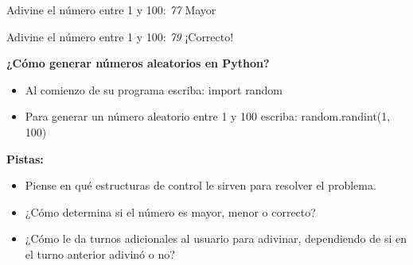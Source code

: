 \documentclass[11pt]{article}
\providecommand{\tightlist}{%
      \setlength{\itemsep}{0pt}\setlength{\parskip}{0pt}}
\begin{document}
Adivine el número entre 1 y 100: \emph{77} Mayor

Adivine el número entre 1 y 100: \emph{79} ¡Correcto!

    \textbf{¿Cómo generar números aleatorios en Python?}

\begin{itemize}
\tightlist
\item
  Al comienzo de su programa escriba: import random
\item
  Para generar un número aleatorio entre 1 y 100 escriba:
  random.randint(1, 100)
\end{itemize}

    \textbf{Pistas:}

\begin{itemize}
\tightlist
\item
  Piense en qué estructuras de control le sirven para resolver el
  problema.
\item
  ¿Cómo determina si el número es mayor, menor o correcto?
\item
  ¿Cómo le da turnos adicionales al usuario para adivinar, dependiendo
  de si en el turno anterior adivinó o no?
\end{itemize}
\end{document}
